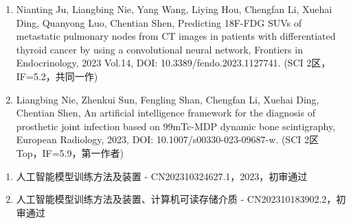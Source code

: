 \begin{publications}
    \begin{enumerate}
        \item Nianting Ju, Liangbing Nie, Yang Wang, Liying Hou, Chengfan Li, Xuehai Ding, Quanyong Luo, Chentian Shen, Predicting 18F-FDG SUVs of metastatic pulmonary nodes from CT images in patients with differentiated thyroid cancer by using a convolutional neural network, Frontiers in Endocrinology, 2023 Vol.14, DOI: 10.3389/fendo.2023.1127741. (SCI 2区，IF=5.2，共同一作)
        \item Liangbing Nie, Zhenkui Sun, Fengling Shan, Chengfan Li, Xuehai Ding, Chentian Shen, An artificial intelligence framework for the diagnosis of prosthetic joint infection based on 99mTc-MDP dynamic bone scintigraphy, European Radiology, 2023, DOI: 10.1007/s00330-023-09687-w. (SCI 2区 Top，IF=5.9，第一作者)
    \end{enumerate}

    \begin{enumerate}
        \item 人工智能模型训练方法及装置 - CN202310324627.1，2023，初审通过
        \item 人工智能模型训练方法及装置、计算机可读存储介质 - CN202310183902.2，初审通过
    \end{enumerate}
\end{publications}